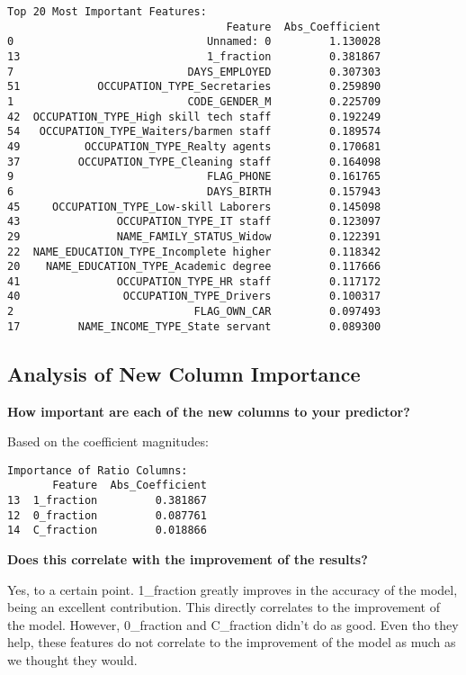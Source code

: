 \documentclass[12pt]{article}
\begin{document}
\begin{verbatim}
Top 20 Most Important Features:
                                  Feature  Abs_Coefficient
0                              Unnamed: 0         1.130028
13                             1_fraction         0.381867
7                           DAYS_EMPLOYED         0.307303
51            OCCUPATION_TYPE_Secretaries         0.259890
1                           CODE_GENDER_M         0.225709
42  OCCUPATION_TYPE_High skill tech staff         0.192249
54   OCCUPATION_TYPE_Waiters/barmen staff         0.189574
49          OCCUPATION_TYPE_Realty agents         0.170681
37         OCCUPATION_TYPE_Cleaning staff         0.164098
9                              FLAG_PHONE         0.161765
6                              DAYS_BIRTH         0.157943
45     OCCUPATION_TYPE_Low-skill Laborers         0.145098
43               OCCUPATION_TYPE_IT staff         0.123097
29               NAME_FAMILY_STATUS_Widow         0.122391
22  NAME_EDUCATION_TYPE_Incomplete higher         0.118342
20    NAME_EDUCATION_TYPE_Academic degree         0.117666
41               OCCUPATION_TYPE_HR staff         0.117172
40                OCCUPATION_TYPE_Drivers         0.100317
2                            FLAG_OWN_CAR         0.097493
17         NAME_INCOME_TYPE_State servant         0.089300
\end{verbatim}

\subsection{Analysis of New Column Importance}

\textbf{How important are each of the new columns to your predictor?}

Based on the coefficient magnitudes:

\begin{verbatim}
Importance of Ratio Columns:
       Feature  Abs_Coefficient
13  1_fraction         0.381867
12  0_fraction         0.087761
14  C_fraction         0.018866
\end{verbatim}

\textbf{Does this correlate with the improvement of the results?}

Yes, to a certain point. 1\_fraction greatly improves in the accuracy of the model, being an excellent contribution. This directly correlates to the improvement of the model. However, 0\_fraction and C\_fraction didn't do as good. Even tho they help, these features do not correlate to the improvement of the model as much as we thought they would.
\end{document}
